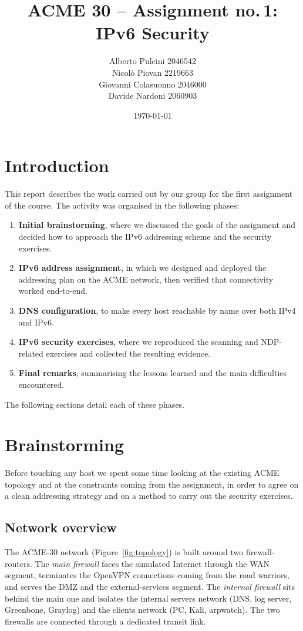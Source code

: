 \documentclass[twocolumn]{NobArticle}
\title{ACME 30 -- Assignment no.\,1: IPv6 Security}
\author{
    Alberto Pulcini 2046542 \\
    Nicolò Piovan 2219663 \\
    Giovanni Colasuonno 2046000 \\
    Davide Nardoni 2060903
}
\date{\today}
\begin{document}
\maketitle
\thispagestyle{empty}

\section{Introduction}

This report describes the work carried out by our group for the first
assignment of the course. The activity was organised in the following phases:

\begin{enumerate}
    \item \textbf{Initial brainstorming}, where we discussed the goals of the
    assignment and decided how to approach the IPv6 addressing scheme and the
    security exercises.
    \item \textbf{IPv6 address assignment}, in which we designed and deployed
    the addressing plan on the ACME network, then verified that connectivity
    worked end-to-end.
    \item \textbf{DNS configuration}, to make every host reachable by name
    over both IPv4 and IPv6.
    \item \textbf{IPv6 security exercises}, where we reproduced the scanning
    and NDP-related exercises and collected the resulting evidence.
    \item \textbf{Final remarks}, summarising the lessons learned and the
    main difficulties encountered.
\end{enumerate}

The following sections detail each of these phases.

\section{Brainstorming}

Before touching any host we spent some time looking at the existing ACME
topology and at the constraints coming from the assignment, in order to agree
on a clean addressing strategy and on a method to carry out the security
exercises.

\subsection{Network overview}

The ACME-30 network (Figure~\ref{fig:topology}) is built around two
firewall-routers. The \textit{main firewall} faces the simulated Internet
through the WAN segment, terminates the OpenVPN connections coming from the
road warriors, and serves the DMZ and the external-services segment. The
\textit{internal firewall} sits behind the main one and isolates the internal
servers network (DNS, log server, Greenbone, Graylog) and the clients network
(PC, Kali, arpwatch). The two firewalls are connected through a dedicated
transit link.
\end{document}
